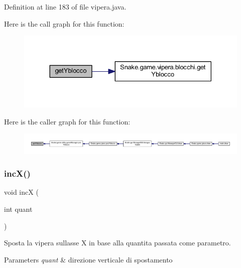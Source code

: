 Definition at line 183 of file vipera.\+java.

Here is the call graph for this function\+:
\nopagebreak
\begin{figure}[H]
\begin{center}
\leavevmode
\includegraphics[width=330pt]{class_snake_1_1game_1_1vipera_1_1vipera_a4fad016a4b1de9e17b7092abd420d962_cgraph}
\end{center}
\end{figure}
Here is the caller graph for this function\+:
\nopagebreak
\begin{figure}[H]
\begin{center}
\leavevmode
\includegraphics[width=350pt]{class_snake_1_1game_1_1vipera_1_1vipera_a4fad016a4b1de9e17b7092abd420d962_icgraph}
\end{center}
\end{figure}
\mbox{\label{class_snake_1_1game_1_1vipera_1_1vipera_ab776bb3430d4d6d0a27bb94ae74ee07c}} 
\subsubsection{\texorpdfstring{inc\+X()}{incX()}}
{\footnotesize\ttfamily void incX (\begin{DoxyParamCaption}\item[{int}]{quant }\end{DoxyParamCaption})}



Sposta la vipera sull\textquotesingle{}asse X in base alla quantita passata come parametro. 


\begin{DoxyParams}{Parameters}
{\em quant} & direzione verticale di spostamento \\
\hline
\end{DoxyParams}


